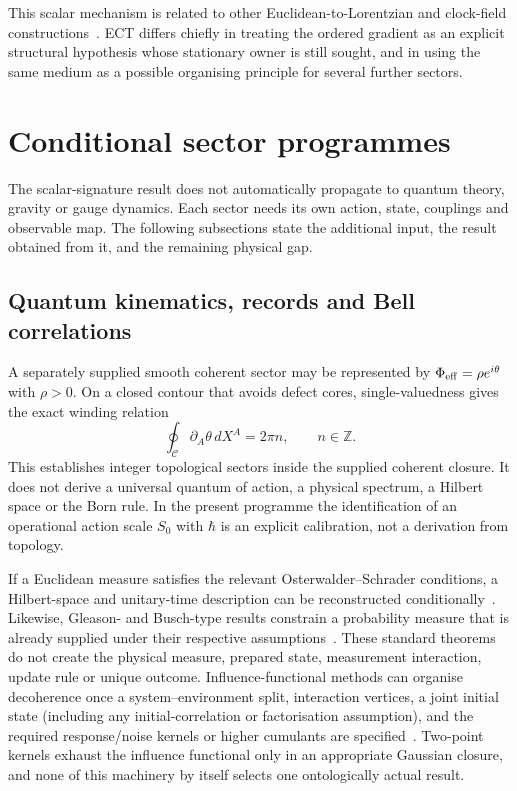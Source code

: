 \documentclass[11pt,a4paper]{article}
\begin{document}
This scalar mechanism is related to other Euclidean-to-Lorentzian and
clock-field constructions~\cite{GirelliLiberatiSindoni2009,MukohyamaUzan2013}.
ECT differs chiefly in treating the ordered gradient as an explicit structural
hypothesis whose stationary owner is still sought, and in using the same
medium as a possible organising principle for several further sectors.

\section{Conditional sector programmes}
\label{sec:programmes}

The scalar-signature result does not automatically propagate to quantum
theory, gravity or gauge dynamics.  Each sector needs its own action, state,
couplings and observable map.  The following subsections state the additional
input, the result obtained from it, and the remaining physical gap.

\subsection{Quantum kinematics, records and Bell correlations}

A separately supplied smooth coherent sector may be represented by
$\Phi_{\rm eff}=\rho e^{i\theta}$ with $\rho>0$.  On a closed contour that
avoids defect cores, single-valuedness gives the exact winding relation
\begin{equation}
 \oint_{\mathcal C}\partial_A\theta\,dX^A=2\pi n,
 \qquad n\in\mathbb Z .
 \label{eq:winding}
\end{equation}
This establishes integer topological sectors inside the supplied coherent
closure.  It does not derive a universal quantum of action, a physical
spectrum, a Hilbert space or the Born rule.  In the present programme the
identification of an operational action scale $S_0$ with $\hbar$ is an
explicit calibration, not a derivation from topology.

If a Euclidean measure satisfies the relevant Osterwalder--Schrader
conditions, a Hilbert-space and unitary-time description can be reconstructed
conditionally~\cite{OsterwalderSchrader1973,OsterwalderSchrader1975}.  Likewise,
Gleason- and Busch-type results constrain a probability measure that is
already supplied under their respective assumptions~\cite{Gleason1957,Busch2003Gleason}.
These standard theorems do not create the physical measure, prepared state,
measurement interaction, update rule or unique outcome.  Influence-functional
methods can organise decoherence once a system--environment split,
interaction vertices, a joint initial state (including any initial-correlation
or factorisation assumption), and the required response/noise kernels or
higher cumulants are specified~\cite{FeynmanVernon1963}.  Two-point kernels
exhaust the influence functional only in an appropriate Gaussian closure, and
none of this machinery by itself selects one ontologically actual result.
\end{document}
